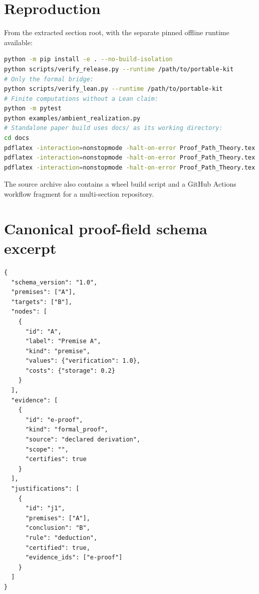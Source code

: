 \documentclass[11pt,oneside]{article}
\theoremstyle{definition}
\theoremstyle{remark}
\begin{document}
\section{Reproduction}

From the extracted section root, with the separate pinned offline runtime available:

\begin{lstlisting}[language=bash]
python -m pip install -e . --no-build-isolation
python scripts/verify_release.py --runtime /path/to/portable-kit
# Only the formal bridge:
python scripts/verify_lean.py --runtime /path/to/portable-kit
# Finite computations without a Lean claim:
python -m pytest
python examples/ambient_realization.py
# Standalone paper build uses docs/ as its working directory:
cd docs
pdflatex -interaction=nonstopmode -halt-on-error Proof_Path_Theory.tex
pdflatex -interaction=nonstopmode -halt-on-error Proof_Path_Theory.tex
pdflatex -interaction=nonstopmode -halt-on-error Proof_Path_Theory.tex
\end{lstlisting}

The source archive also contains a wheel build script and a GitHub Actions workflow fragment for a multi-section repository.

\section{Canonical proof-field schema excerpt}

\begin{lstlisting}[language={},basicstyle=\ttfamily\scriptsize]
{
  "schema_version": "1.0",
  "premises": ["A"],
  "targets": ["B"],
  "nodes": [
    {
      "id": "A",
      "label": "Premise A",
      "kind": "premise",
      "values": {"verification": 1.0},
      "costs": {"storage": 0.2}
    }
  ],
  "evidence": [
    {
      "id": "e-proof",
      "kind": "formal_proof",
      "source": "declared derivation",
      "scope": "",
      "certifies": true
    }
  ],
  "justifications": [
    {
      "id": "j1",
      "premises": ["A"],
      "conclusion": "B",
      "rule": "deduction",
      "certified": true,
      "evidence_ids": ["e-proof"]
    }
  ]
}
\end{lstlisting}
\end{document}
